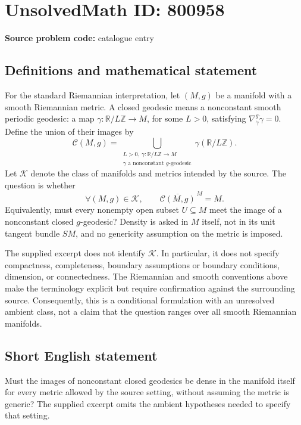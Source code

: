 \documentclass[11pt]{article}
\newcommand{\Z}{\mathbb{Z}}
\newcommand{\R}{\mathbb{R}}
\begin{document}
\section*{UnsolvedMath ID: 800958}
\textbf{Source problem code:} catalogue entry
\subsection{Definitions and mathematical statement}
For the standard Riemannian interpretation, let \((M,g)\) be a manifold with a smooth Riemannian metric. A closed geodesic means a nonconstant smooth periodic geodesic: a map \(\gamma:\R/L\Z\to M\), for some \(L>0\), satisfying \(\nabla^g_{\dot\gamma}\dot\gamma=0\). Define the union of their images by
\[
\mathcal C(M,g)=\bigcup_{\substack{L>0,\ \gamma:\R/L\Z\to M\\ \gamma\text{ a nonconstant }g\text{-geodesic}}}\gamma(\R/L\Z).
\]
Let \(\mathcal K\) denote the class of manifolds and metrics intended by the source. The question is whether
\[
\forall (M,g)\in\mathcal K,\qquad \overline{\mathcal C(M,g)}^{\,M}=M.
\]
Equivalently, must every nonempty open subset \(U\subseteq M\) meet the image of a nonconstant closed \(g\)-geodesic? Density is asked in \(M\) itself, not in its unit tangent bundle \(SM\), and no genericity assumption on the metric is imposed.

The supplied excerpt does not identify \(\mathcal K\). In particular, it does not specify compactness, completeness, boundary assumptions or boundary conditions, dimension, or connectedness. The Riemannian and smooth conventions above make the terminology explicit but require confirmation against the surrounding source. Consequently, this is a conditional formulation with an unresolved ambient class, not a claim that the question ranges over all smooth Riemannian manifolds.
\subsection{Short English statement}
Must the images of nonconstant closed geodesics be dense in the manifold itself for every metric allowed by the source setting, without assuming the metric is generic? The supplied excerpt omits the ambient hypotheses needed to specify that setting.
\end{document}
